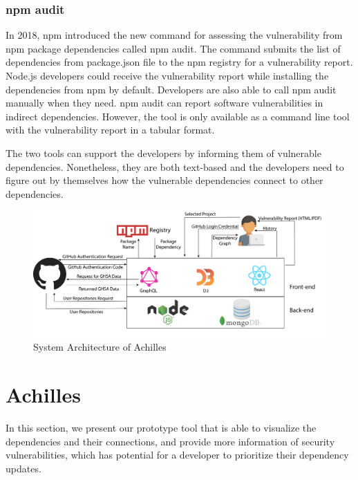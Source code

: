 \documentclass[conference]{IEEEtran}
\begin{document}
	\subsubsection{npm audit}
	In 2018, npm introduced the new command for assessing the vulnerability from npm package dependencies called npm audit.
	The command submits the list of dependencies from package.json file to the npm registry for a vulnerability report.
	Node.js developers could receive the vulnerability report while installing the dependencies from npm by default.
	Developers are also able to call npm audit manually when they need. npm audit can report software vulnerabilities in indirect dependencies. 
	However, the tool is only available as a command line tool with the vulnerability report in a tabular format.
	
	The two tools can support the developers by informing them of vulnerable dependencies. Nonetheless, they are both text-based and the developers need to figure out by themselves how the vulnerable dependencies connect to other dependencies. %
	
	\begin{figure}[tb]
		\centering
		\includegraphics[width=1.2\columnwidth]{Figures/SystemArch.png}
		\caption{System Architecture of Achilles}
		\label{fig:system_architecture}
	\end{figure}
	
	\section{Achilles}
	In this section, we present our prototype tool that is able to visualize the dependencies and their connections, and provide more information of security vulnerabilities, which has potential for a developer to prioritize their dependency updates. 
	
\end{document}
